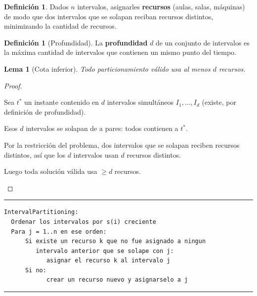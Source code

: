 \documentclass[11pt,a4paper]{article}
\theoremstyle{plain}
\newtheorem{lema}[teorema]{Lema}
\theoremstyle{definition}
\newtheorem{definicion}[teorema]{Definición}
\theoremstyle{remark}
\newcommand{\codigoinicio}{\begin{center}\begin{minipage}{0.93\textwidth}%
  \hrule\vspace{3pt}}
\newcommand{\codigofin}{\vspace{-4pt}\hrule\end{minipage}\end{center}}
\begin{document}
\begin{definicion}
Dados $n$ intervalos, asignarles \textbf{recursos} (aulas, salas, máquinas) de modo que
dos intervalos que se solapan reciban recursos distintos, minimizando la cantidad de
recursos.
\end{definicion}

\begin{definicion}[Profundidad]
La \textbf{profundidad} $d$ de un conjunto de intervalos es la máxima cantidad de
intervalos que contienen un mismo punto del tiempo.
\end{definicion}

\begin{lema}[Cota inferior]
Todo particionamiento válido usa al menos $d$ recursos.
\end{lema}
\begin{proof}
\begin{pasos}
\item Sea $t^\ast$ un instante contenido en $d$ intervalos simultáneos
$I_1,\dots,I_d$ (existe, por definición de profundidad).
\item Esos $d$ intervalos se solapan de a pares: todos contienen a $t^\ast$.
\item Por la restricción del problema, dos intervalos que se solapan reciben recursos
distintos, así que los $d$ intervalos usan $d$ recursos distintos.
\item Luego toda solución válida usa $\ge d$ recursos. \qedhere
\end{pasos}
\end{proof}

\codigoinicio
\begin{verbatim}
IntervalPartitioning:
  Ordenar los intervalos por s(i) creciente
  Para j = 1..n en ese orden:
      Si existe un recurso k que no fue asignado a ningun
         intervalo anterior que se solape con j:
            asignar el recurso k al intervalo j
      Si no:
            crear un recurso nuevo y asignarselo a j
\end{verbatim}
\codigofin
\end{document}
